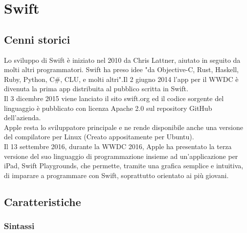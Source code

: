 \chapter{Swift}

\section{Cenni storici}
Lo sviluppo di Swift è iniziato nel 2010 da Chris Lattner, aiutato in seguito da molti altri programmatori. Swift ha preso idee "da Objective-C, Rust, Haskell, Ruby, Python, C\#, CLU, e molti altri".Il 2 giugno 2014 l'app per il WWDC è divenuta la prima app distribuita al pubblico scritta in Swift.\\Il 3 dicembre 2015 viene lanciato il sito swift.org ed il codice sorgente del linguaggio è pubblicato con licenza Apache 2.0 sul repository GitHub dell'azienda.\\Apple resta lo sviluppatore principale e ne rende disponibile anche una versione del compilatore per Linux (Creato appositamente per Ubuntu).\\Il 13 settembre 2016, durante la WWDC 2016, Apple ha presentato la terza versione del suo linguaggio di programmazione insieme ad un'applicazione per iPad, Swift Playgrounds, che permette, tramite una grafica semplice e intuitiva, di imparare a programmare con Swift, soprattutto orientato ai più giovani.
\section{Caratteristiche}
\subsection{Sintassi}
